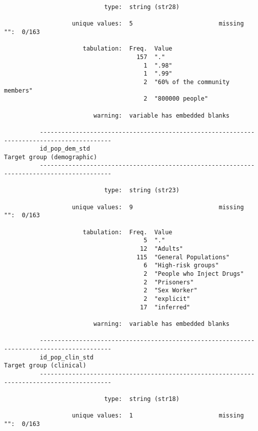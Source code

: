 \documentclass{article}
\begin{document}
\begin{verbatim}
                            type:  string (str28)
          
                   unique values:  5                        missing "":  0/163
          
                      tabulation:  Freq.  Value
                                     157  "."
                                       1  ".98"
                                       1  ".99"
                                       2  "60% of the community members"
                                       2  "800000 people"
          
                         warning:  variable has embedded blanks
          
          ------------------------------------------------------------------------------------------
          id_pop_dem_std                                                  Target group (demographic)
          ------------------------------------------------------------------------------------------
          
                            type:  string (str23)
          
                   unique values:  9                        missing "":  0/163
          
                      tabulation:  Freq.  Value
                                       5  "."
                                      12  "Adults"
                                     115  "General Populations"
                                       6  "High-risk groups"
                                       2  "People who Inject Drugs"
                                       2  "Prisoners"
                                       2  "Sex Worker"
                                       2  "explicit"
                                      17  "inferred"
          
                         warning:  variable has embedded blanks
          
          ------------------------------------------------------------------------------------------
          id_pop_clin_std                                                    Target group (clinical)
          ------------------------------------------------------------------------------------------
          
                            type:  string (str18)
          
                   unique values:  1                        missing "":  0/163
          

\end{verbatim}
\end{document}
